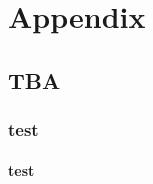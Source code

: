 


\chapter{Appendix}

\renewcommand{\thesection}{\Alph{section}}



\section{TBA}

\subsection{test}

\subsubsection{test}


